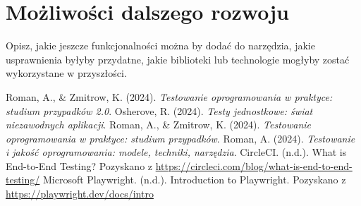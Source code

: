 \documentclass[12pt]{report}
\begin{document}
\section{Możliwości dalszego rozwoju}
{Opisz, jakie jeszcze funkcjonalności można by dodać do narzędzia, jakie usprawnienia byłyby przydatne, jakie biblioteki lub technologie mogłyby zostać wykorzystane w przyszłości.}

\begin{thebibliography}{9}
     Roman, A., \& Zmitrow, K. (2024). \textit{Testowanie oprogramowania w praktyce: studium przypadków 2.0}.
     Osherove, R. (2024). \textit{Testy jednostkowe: świat niezawodnych aplikacji}.
     Roman, A., \& Zmitrow, K. (2024). \textit{Testowanie oprogramowania w praktyce: studium przypadków}.
     Roman, A. (2024). \textit{Testowanie i jakość oprogramowania: modele, techniki, narzędzia}.
     CircleCI. (n.d.). What is End-to-End Testing? Pozyskano z \url{https://circleci.com/blog/what-is-end-to-end-testing/}
     Microsoft Playwright. (n.d.). Introduction to Playwright. Pozyskano z \url{https://playwright.dev/docs/intro}
\end{thebibliography}
\end{document}
